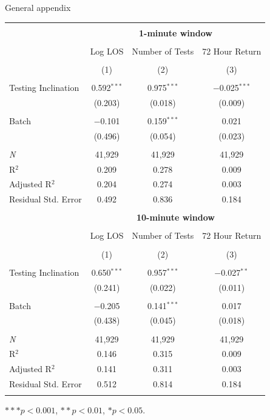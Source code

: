 \documentclass[,,nonblindrev]{informs}
\begin{document}
\begin{APPENDIX}{General appendix}
\begin{table}[!htbp]
\begin{tabular}{@{\extracolsep{10pt}}lccc} 
\\[-1.8ex]\hline 
\hline \\[-1.8ex] 
 & \multicolumn{3}{c}{\textbf{1-minute window}} \\
\\[-1.8ex] & Log LOS & Number of Tests & 72 Hour Return \\ 
\\[-1.8ex] & (1) & (2) & (3)\\ 
\hline \\[-1.8ex] 
 Testing Inclination & 0.592$^{***}$ & 0.975$^{***}$ & $-$0.025$^{***}$ \\ 
  & (0.203) & (0.018) & (0.009) \\ 
  & & & \\ 
 Batch & $-$0.101 & 0.159$^{***}$ & 0.021 \\ 
  & (0.496) & (0.054) & (0.023) \\ 
  & & & \\ 
\textit{N} & 41,929 & 41,929 & 41,929 \\ 
R$^{2}$ & 0.209 & 0.278 & 0.009 \\ 
Adjusted R$^{2}$ & 0.204 & 0.274 & 0.003 \\ 
Residual Std. Error & 0.492 & 0.836 & 0.184 \\ 
\hline 
\\[-1.8ex] & \multicolumn{3}{c}{\textbf{10-minute window}} \\
\\[-1.8ex] & Log LOS & Number of Tests & 72 Hour Return \\ 
\\[-1.8ex] & (1) & (2) & (3)\\ 
\hline \\[-1.8ex] 
 Testing Inclination & 0.650$^{***}$ & 0.957$^{***}$ & $-$0.027$^{**}$ \\ 
  & (0.241) & (0.022) & (0.011) \\ 
  & & & \\ 
 Batch & $-$0.205 & 0.141$^{***}$ & 0.017 \\ 
  & (0.438) & (0.045) & (0.018) \\ 
  & & & \\ 
\textit{N} & 41,929 & 41,929 & 41,929 \\ 
R$^{2}$ & 0.146 & 0.315 & 0.009 \\ 
Adjusted R$^{2}$ & 0.141 & 0.311 & 0.003 \\ 
Residual Std. Error & 0.512 & 0.814 & 0.184 \\ 
\hline 
\hline \\[-1.8ex] 
\end{tabular}
\begin{tablenotes}
\small
\item $*** p < 0.001$, $** p < 0.01$, $* p < 0.05$.
\end{tablenotes}
\end{table}


\end{APPENDIX}
\end{document}
